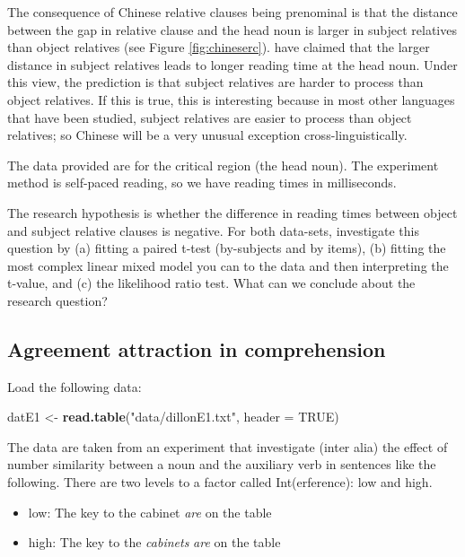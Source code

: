 \documentclass[12pt,]{krantz}
\newenvironment{Shaded}{\begin{snugshade}}{\end{snugshade}}
\newcommand{\DataTypeTok}[1]{\textcolor[rgb]{0.13,0.29,0.53}{#1}}
\newcommand{\KeywordTok}[1]{\textcolor[rgb]{0.13,0.29,0.53}{\textbf{#1}}}
\newcommand{\NormalTok}[1]{#1}
\newcommand{\OtherTok}[1]{\textcolor[rgb]{0.56,0.35,0.01}{#1}}
\newcommand{\StringTok}[1]{\textcolor[rgb]{0.31,0.60,0.02}{#1}}
\providecommand{\tightlist}{%
  \setlength{\itemsep}{0pt}\setlength{\parskip}{0pt}}
\begin{document}
The consequence of Chinese relative clauses being prenominal is that the distance between the gap in relative clause and the head noun is larger in subject relatives than object relatives (see Figure \ref{fig:chineserc}). \citet{hsiao03} have claimed that the larger distance in subject relatives leads to longer reading time at the head noun. Under this view, the prediction is that subject relatives are harder to process than object relatives. If this is true, this is interesting because in most other languages that have been studied, subject relatives are easier to process than object relatives; so Chinese will be a very unusual exception cross-linguistically.

The data provided are for the critical region (the head noun). The experiment method is self-paced reading, so we have reading times in milliseconds.

The research hypothesis is whether the difference in reading times between object and subject relative clauses is negative. For both data-sets, investigate this question by (a) fitting a paired t-test (by-subjects and by items), (b) fitting the most complex linear mixed model you can to the data and then interpreting the t-value, and (c) the likelihood ratio test. What can we conclude about the research question?

\hypertarget{sec:HypTestExerciseAgrmt}{%
\subsection{Agreement attraction in comprehension}\label{sec:HypTestExerciseAgrmt}}

Load the following data:

\begin{Shaded}
\begin{Highlighting}[]
\NormalTok{datE1 <-}\StringTok{ }\KeywordTok{read.table}\NormalTok{(}\StringTok{"data/dillonE1.txt"}\NormalTok{, }\DataTypeTok{header =} \OtherTok{TRUE}\NormalTok{)}
\end{Highlighting}
\end{Shaded}

The data are taken from an experiment that investigate (inter alia) the effect of number similarity between a noun and the auxiliary verb in sentences like the following. There are two levels to a factor called Int(erference): low and high.

\begin{itemize}
\tightlist
\item
  low: The key to the cabinet \emph{are} on the table
\item
  high: The key to the \emph{cabinets} \emph{are} on the table
\end{itemize}
\end{document}

